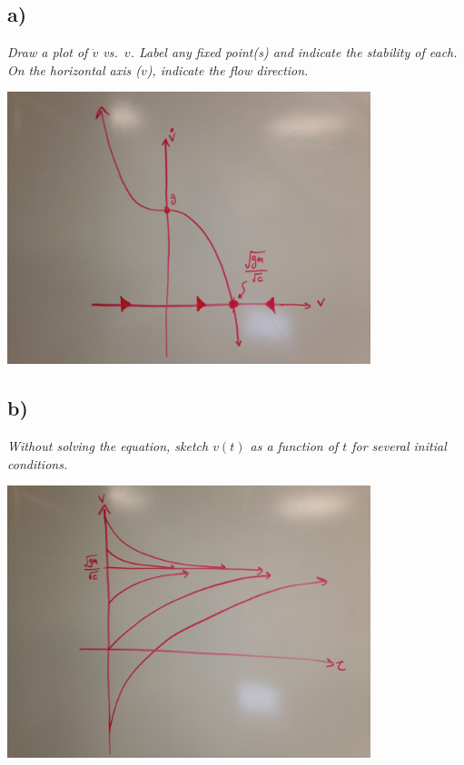 \documentclass[12pt]{article}
\begin{document}
\subsection*{ a)}
{\it Draw a plot of $\dot{v}$ vs.~$v$.  Label any fixed point(s) and indicate the stability of each.  On the horizontal axis ($v$), indicate the flow direction.}

\begin{center}
	\includegraphics[width=400px]{figures/3_a.jpg}
\end{center}

\subsection*{ b)}
{\it Without solving the equation, sketch $v(t)$ as a function of $t$ for several initial conditions.}

\begin{center}
	\includegraphics[width=400px]{figures/3_b.jpg}
\end{center}
\end{document}
